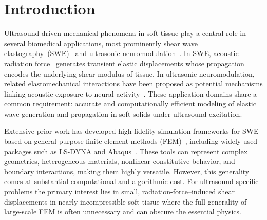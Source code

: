 \documentclass{iopjournal}
\begin{document}
\section{Introduction}
\label{sec:introduction}

Ultrasound-driven mechanical phenomena in soft tissue play a central
role in several biomedical applications, most prominently shear wave
elastography~(SWE)~\cite{sarvazyan1998elasticity,barr2015elastography,gennisson2013ultrasound,sigrist2017ultrasound}
and ultrasonic
neuromodulation~\cite{blackmore2019ultrasound,jones2022neuromodulation,pinton2012braintherapy}.
In SWE, acoustic radiation
force~\cite{nightingale2002radiation,palmeri2011radiation,nyborg1965acoustic,torr1984acoustic}
generates transient elastic displacements whose propagation encodes
the underlying shear modulus of tissue. In ultrasonic neuromodulation,
related elastomechanical interactions have been proposed as potential
mechanisms linking acoustic exposure to neural
activity~\cite{blackmore2019ultrasound,kubanek2018neuromodulation,yoo2022focused}.
These application domains share a common requirement: accurate and
computationally efficient modeling of elastic wave generation and
propagation in soft solids under ultrasound excitation.

Extensive prior work has developed high-fidelity simulation frameworks
for SWE based on general-purpose finite element methods
(FEM)~\cite{hughes2000finite,zienkiewicz2005finite,palmeri2017fem}, including widely
used packages such as LS-DYNA and
Abaqus~\cite{bercoff2004supersonic}. These tools
can represent complex geometries, heterogeneous materials, nonlinear
constitutive behavior, and boundary interactions, making them highly
versatile. However, this generality comes at substantial computational
and algorithmic cost. For ultrasound-specific problems the
primary interest lies in small, radiation-force--induced shear
displacements in nearly incompressible soft tissue where the full
generality of large-scale FEM is often unnecessary and can obscure the
essential physics.
\end{document}
